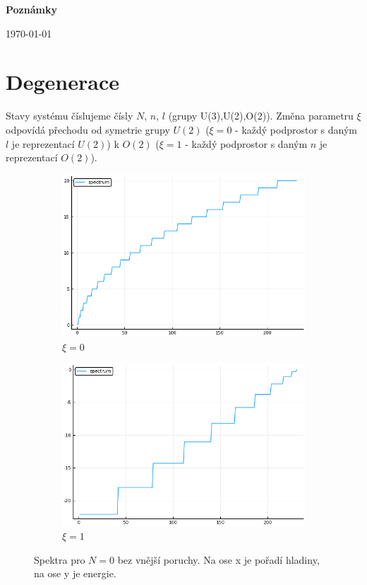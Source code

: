 \documentclass{article}
\begin{document}
\begin{center}
    \Large
    \textbf{Poznámky}
           
    \vspace{0.4cm}
    \small
    \today
\end{center}

\section{Degenerace}
Stavy systému číslujeme čísly $N,\,n,\,l$ (grupy U(3),U(2),O(2)). Změna parametru $\xi$ odpovídá přechodu od symetrie grupy $U(2)$
 ($\xi = 0$ - každý podprostor s daným $l$ je reprezentací $U(2)$) 
k $O(2)$  ($\xi = 1$ - každý podprostor s daným $n$ je reprezentací $O(2)$). 

\begin{figure}[H]
    \centering
    \begin{subfigure}{.5\textwidth}
      \centering
      \includegraphics[width=.95\linewidth]{Spc0.png}
      \caption{$\xi = 0$}
      \label{fig:sub1}
    \end{subfigure}%
    \begin{subfigure}{.5\textwidth}
      \centering
      \includegraphics[width=.95\linewidth]{Spc1.png}
      \caption{$\xi = 1$}
      \label{fig:sub2}
    \end{subfigure}
    \caption{Spektra pro $N = 0$ bez vnější poruchy. Na ose x je pořadí hladiny, na ose y je energie.}
    \label{fig:test}
    \end{figure}
\end{document}
